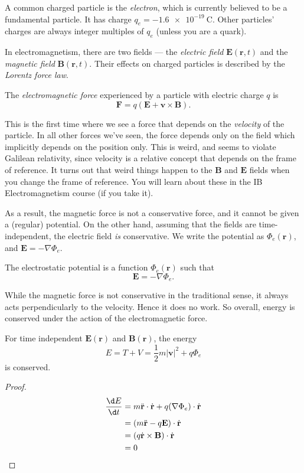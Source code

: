 \documentclass[a4paper]{article}
\begin{document}
A common charged particle is the \emph{electron}, which is currently believed to be a fundamental particle. It has charge $q_e = \SI{-1.6e-19}{\coulomb}$. Other particles' charges are always integer multiples of $q_e$ (unless you are a quark).

In electromagnetism, there are two fields --- the \emph{electric field} $\mathbf{E}(\mathbf{r}, t)$ and the \emph{magnetic field} $\mathbf{B}(\mathbf{r}, t)$. Their effects on charged particles is described by the \emph{Lorentz force law}.
\begin{law}
  The \emph{electromagnetic force} experienced by a particle with electric charge $q$ is
  \[
    \mathbf{F} = q(\mathbf{E} + \mathbf{v}\times \mathbf{B}).
  \]
\end{law}
This is the first time where we see a force that depends on the \emph{velocity} of the particle. In all other forces we've seen, the force depends only on the field which implicitly depends on the position only. This is weird, and seems to violate Galilean relativity, since velocity is a relative concept that depends on the frame of reference. It turns out that weird things happen to the $\mathbf{B}$ and $\mathbf{E}$ fields when you change the frame of reference. You will learn about these in the IB Electromagnetism course (if you take it).

As a result, the magnetic force is not a conservative force, and it cannot be given a (regular) potential. On the other hand, assuming that the fields are time-independent, the electric field \emph{is} conservative. We write the potential as $\Phi_e(\mathbf{r})$, and $\mathbf{E} = -\nabla \Phi_e$.

\begin{defi}
  The electrostatic potential is a function $\Phi_e(\mathbf{r})$ such that
  \[
    \mathbf{E} = -\nabla \Phi_e.
  \]
\end{defi}
While the magnetic force is not conservative in the traditional sense, it always acts perpendicularly to the velocity. Hence it does no work. So overall, energy is conserved under the action of the electromagnetic force.
\begin{prop}
  For time independent $\mathbf{E}(\mathbf{r})$ and $\mathbf{B}(\mathbf{r})$, the energy
  \[
    E = T + V = \frac{1}{2}m|\mathbf{v}|^2 + q\Phi_e
  \]
  is conserved.
\end{prop}

\begin{proof}
  \begin{align*}
    \frac{\d E}{\d t} &= m\ddot{\mathbf{r}}\cdot \dot{\mathbf{r}} + q(\nabla \Phi_e)\cdot \dot{\mathbf{r}}\\
    &= (m\ddot{\mathbf{r}} - q\mathbf{E}) \cdot \dot{\mathbf{r}}\\
    &= (q\dot{\mathbf{r}}\times \mathbf{B})\cdot \dot{\mathbf{r}}\\
    &= 0\qedhere
  \end{align*}
\end{proof}
\end{document}
